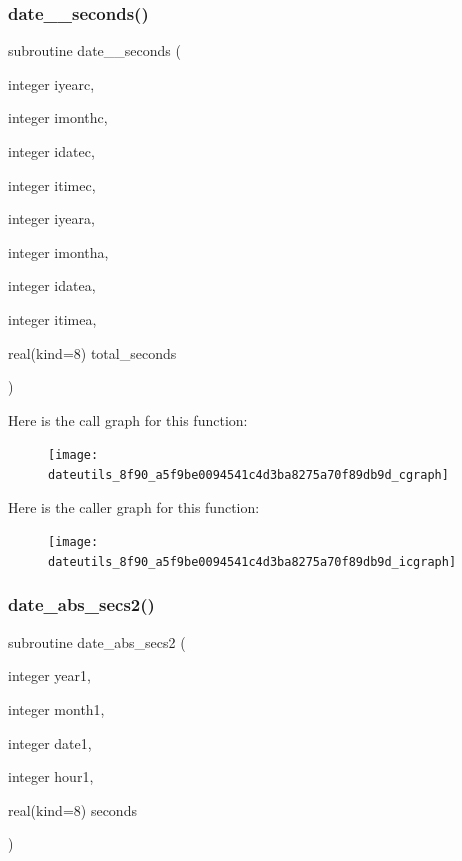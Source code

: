 \subsubsection{\texorpdfstring{date\+\_\+\_\+seconds()}{date\_2\_seconds()}}
{\footnotesize\ttfamily subroutine date\+\_\+\_\+seconds (\begin{DoxyParamCaption}\item[{integer}]{iyearc,  }\item[{integer}]{imonthc,  }\item[{integer}]{idatec,  }\item[{integer}]{itimec,  }\item[{integer}]{iyeara,  }\item[{integer}]{imontha,  }\item[{integer}]{idatea,  }\item[{integer}]{itimea,  }\item[{real(kind=8)}]{total\+\_\+seconds }\end{DoxyParamCaption})}

Here is the call graph for this function\+:
\nopagebreak
\begin{figure}[H]
\begin{center}
\leavevmode
\texttt{[image: dateutils\_8f90\_a5f9be0094541c4d3ba8275a70f89db9d\_cgraph]}
\end{center}
\end{figure}
Here is the caller graph for this function\+:
\nopagebreak
\begin{figure}[H]
\begin{center}
\leavevmode
\texttt{[image: dateutils\_8f90\_a5f9be0094541c4d3ba8275a70f89db9d\_icgraph]}
\end{center}
\end{figure}
\mbox{\label{dateutils_8f90_a56423cc8c95e08c48faaadf0ae9a2100}} 
\subsubsection{\texorpdfstring{date\+\_\+abs\+\_\+secs2()}{date\_abs\_secs2()}}
{\footnotesize\ttfamily subroutine date\+\_\+abs\+\_\+secs2 (\begin{DoxyParamCaption}\item[{integer}]{year1,  }\item[{integer}]{month1,  }\item[{integer}]{date1,  }\item[{integer}]{hour1,  }\item[{real(kind=8)}]{seconds }\end{DoxyParamCaption})}

